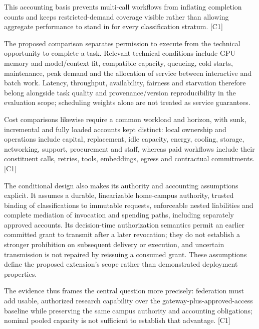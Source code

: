 \documentclass[11pt]{article}
\begin{document}
This accounting basis prevents multi-call workflows from inflating completion counts and keeps restricted-demand coverage visible rather than allowing aggregate performance to stand in for every classification stratum. [C1]

The proposed comparison separates permission to execute from the technical opportunity to complete a task. Relevant technical conditions include GPU memory and model/context fit, compatible capacity, queueing, cold starts, maintenance, peak demand and the allocation of service between interactive and batch work. Latency, throughput, availability, fairness and starvation therefore belong alongside task quality and provenance/version reproducibility in the evaluation scope; scheduling weights alone are not treated as service guarantees.

Cost comparisons likewise require a common workload and horizon, with sunk, incremental and fully loaded accounts kept distinct: local ownership and operations include capital, replacement, idle capacity, energy, cooling, storage, networking, support, procurement and staff, whereas paid workflows include their constituent calls, retries, tools, embeddings, egress and contractual commitments. [C1]

The conditional design also makes its authority and accounting assumptions explicit. It assumes a durable, linearizable home-campus authority, trusted binding of classifications to immutable requests, enforceable nested liabilities and complete mediation of invocation and spending paths, including separately approved accounts. Its decision-time authorization semantics permit an earlier committed grant to transmit after a later revocation; they do not establish a stronger prohibition on subsequent delivery or execution, and uncertain transmission is not repaired by reissuing a consumed grant. These assumptions define the proposed extension\textquoteright{}s scope rather than demonstrated deployment properties.

The evidence thus frames the central question more precisely: federation must add usable, authorized research capability over the gateway-plus-approved-access baseline while preserving the same campus authority and accounting obligations; nominal pooled capacity is not sufficient to establish that advantage. [C1]
\end{document}
